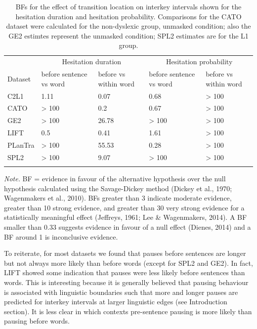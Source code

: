 \documentclass[
  man,floatsintext]{apa7}
\begin{document}
\begin{table}[tbp]

\begin{center}
\begin{threeparttable}

\caption{\label{tab:loceffectconbf}BFs for the effect of transition location on interkey intervals shown for the hesitation duration and hesitation probability. Comparisons for the CATO dataset were calculated for the non-dyslexic group, unmasked condition; also the GE2 estimtes represent the unmasked condition; SPL2 estimates are for the L1 group.}

\begin{tabular}{lp{3cm}p{3cm}p{3cm}p{3cm}}
\toprule
 & \multicolumn{2}{c}{Hesitation duration} & \multicolumn{2}{c}{Hesitation probability} \\
\cmidrule(r){2-3} \cmidrule(r){4-5}
Dataset & before sentence vs word & before vs within word & before sentence vs word & before vs within word\\
\midrule
C2L1 & 1.11 & 0.07 & 0.68 & > 100\\
CATO & > 100 & 0.2 & 0.67 & > 100\\
GE2 & > 100 & 26.78 & > 100 & > 100\\
LIFT & 0.5 & 0.41 & 1.61 & > 100\\
PLanTra & > 100 & 55.53 & 0.28 & > 100\\
SPL2 & > 100 & 9.07 & > 100 & > 100\\
\bottomrule
\addlinespace
\end{tabular}

\begin{tablenotes}[para]
\normalsize{\textit{Note.} BF = evidence in favour of the alternative hypothesis over the null hypothesis calculated using the Savage-Dickey method (Dickey et al., 1970; Wagenmakers et al., 2010). BFs greater than 3 indicate moderate evidence, greater than 10 strong evidence, and greater than 30 very strong evidence for a statistically meaningful effect (Jeffreys, 1961; Lee \& Wagenmakers, 2014). A BF smaller than 0.33 suggests evidence in favour of a null effect (Dienes, 2014) and a BF around 1 is inconclusive evidence.}
\end{tablenotes}

\end{threeparttable}
\end{center}

\end{table}

To reiterate, for most datasets we found that pauses before sentences are longer but not always more likely than before words (except for SPL2 and GE2). In fact, LIFT showed some indication that pauses were less likely before sentences than words. This is interesting because it is generally believed that pausing behaviour is associated with linguistic boundaries such that more and longer pauses are predicted for interkey intervals at larger linguistic edges (see Introduction section). It is less clear in which contexts pre-sentence pausing is more likely than pausing before words.
\end{document}
